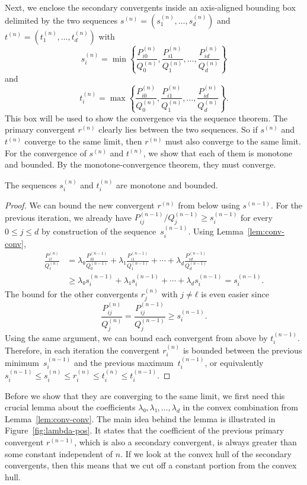 Next, we enclose the secondary convergents inside an axis-aligned bounding box
delimited by the two sequences
$s^{(n)} = (s_1^{(n)}, …, s_d^{(n)})$ and $t^{(n)} = (t_1^{(n)}, …, t_d^{(n)})$ with
\[
  s_i^{(n)} = \min\left\{\frac{P_{i0}^{(n)}}{Q_0^{(n)}}, \frac{P_{i1}^{(n)}}{Q_1^{(n)}}, …, \frac{P_{id}^{(n)}}{Q_d^{(n)}}\right\}
\]
and
\[
  t_i^{(n)} = \max\left\{\frac{P_{i0}^{(n)}}{Q_0^{(n)}}, \frac{P_{i1}^{(n)}}{Q_1^{(n)}}, …, \frac{P_{id}^{(n)}}{Q_d^{(n)}}\right\}.
\]
This box will be used to show the convergence via the sequence theorem.
The primary convergent $r^{(n)}$ clearly lies between the two sequences.
So if $s^{(n)}$ and $t^{(n)}$ converge to the same limit, then $r^{(n)}$ must
also converge to the same limit.
For the convergence of $s^{(n)}$ and $t^{(n)}$, we show that each of them is
monotone and bounded.
By the monotone-convergence theorem, they must converge.

\begin{lemma}
  The sequences $s_i^{(n)}$ and $t_i^{(n)}$ are monotone and bounded.
\end{lemma}

\begin{proof}
  We can bound the new convergent $r^{(n)}$ from below using $s^{(n-1)}$.
  For the previous iteration, we already have $P_{ij}^{(n-1)}/Q_j^{(n-1)} ≥ s_i^{(n-1)}$
  for every $0 ≤ j ≤ d$ by construction of the sequence~$s_i^{(n-1)}$.
  Using Lemma~\ref{lem:conv-conv},
  \begin{align*}
    \frac{P_{iℓ}^{(n)}}{Q_ℓ^{(n)}}
    & = λ₀ \frac{P_{i0}^{(n-1)}}{Q_0^{(n-1)}} + λ₁ \frac{P_{i1}^{(n-1)}}{Q_1^{(n-1)}} + ⋯ + λ_d \frac{P_{id}^{(n-1)}}{Q_d^{(n-1)}} \\
    & ≥ λ₀ s_i^{(n-1)} + λ₁ s_i^{(n-1)} + ⋯ + λ_d s_i^{(n-1)} = s_i^{(n-1)}.
  \end{align*}
  The bound for the other convergents $r_j^{(n)}$ with $j ≠ ℓ$ is even easier since
  \[
    \frac{P_{ij}^{(n)}}{Q_j^{(n)}} = \frac{P_{ij}^{(n-1)}}{Q_j^{(n-1)}} ≥ s_i^{(n-1)}.
  \]
  Using the same argument, we can bound each convergent from above by $t_i^{(n-1)}$.
  Therefore, in each iteration the convergent $r_i^{(n)}$ is
  bounded between the previous minimum~$s_i^{(n-1)}$ and the previous maximum~$t_i^{(n-1)}$,
  or equivalently $s_i^{(n-1)} ≤ s_i^{(n)} ≤ r_i^{(n)} ≤ t_i^{(n)} ≤ t_i^{(n-1)}$.
\end{proof}


Before we show that they are converging to the same limit, we first need this crucial lemma
about the coefficients $λ₀, λ₁, …, λ_d$ in the convex combination from Lemma~\ref{lem:conv-conv}.
The main idea behind the lemma is illustrated in Figure~\ref{fig:lambda-pos}.
It states that the coefficient of the previous primary convergent $r^{(n-1)}$,
which is also a secondary convergent, is always greater than some constant
independent of $n$.
If we look at the convex hull of the secondary convergents, then this means
that we cut off a constant portion from the convex hull.

